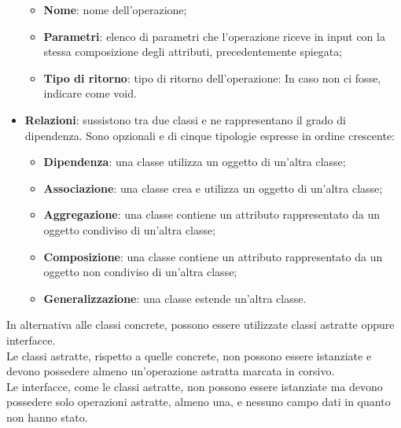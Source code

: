 \begin{itemize}
\begin{itemize}
						\item \textbf{Nome}: nome dell'operazione;
						\item \textbf{Parametri}: elenco di parametri che l'operazione riceve in input con la stessa composizione degli attributi, precedentemente spiegata;
						\item \textbf{Tipo di ritorno}: tipo di ritorno dell'operazione: In caso non ci fosse, indicare come void.
					\end{itemize}
				\item \textbf{Relazioni}: sussistono tra due classi e ne rappresentano il grado di dipendenza. Sono opzionali e di cinque tipologie espresse in ordine crescente:
				\begin{itemize}
					\item \textbf{Dipendenza}: una classe utilizza un oggetto di un'altra classe;
					\item \textbf{Associazione}: una classe crea e utilizza un oggetto di un'altra classe;
					\item \textbf{Aggregazione}: una classe contiene un attributo rappresentato da un oggetto condiviso di un'altra classe;
					\item \textbf{Composizione}: una classe contiene un attributo rappresentato da un oggetto non condiviso di un'altra classe;
					\item \textbf{Generalizzazione}: una classe estende un'altra classe.
				\end{itemize}
			\end{itemize}
			In alternativa alle classi concrete, possono essere utilizzate classi astratte oppure interfacce.\\
			Le classi astratte, rispetto a quelle concrete, non possono essere istanziate e devono possedere almeno un'operazione astratta marcata in corsivo. \\
			Le interfacce, come le classi astratte, non possono essere istanziate ma devono possedere solo operazioni astratte, almeno una, e nessuno campo dati in quanto non hanno stato.
